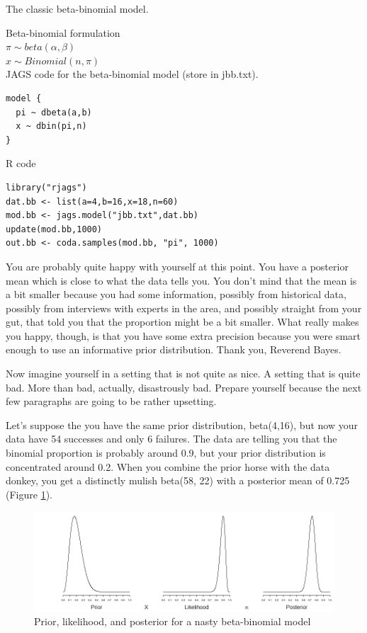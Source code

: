 \documentclass[12pt]{article}
\begin{document}
\begin{table}
\caption{The classic beta-binomial model. \label{tab:bb_code}}

Beta-binomial formulation \\

$\pi \sim beta(\alpha, \beta)$ \\
$x \sim Binomial(n, \pi)$ \\

JAGS code for the beta-binomial model (store in jbb.txt). 

\begin{verbatim}
model {
  pi ~ dbeta(a,b)
  x ~ dbin(pi,n)
}
\end{verbatim}

R code

\begin{verbatim}
library("rjags")
dat.bb <- list(a=4,b=16,x=18,n=60)
mod.bb <- jags.model("jbb.txt",dat.bb)
update(mod.bb,1000)
out.bb <- coda.samples(mod.bb, "pi", 1000)
\end{verbatim}
\end{table}

\linespread{1.6}

You are probably quite happy with yourself at this point. You have a posterior mean which is close to what the data tells you. You don't mind that the mean is a bit smaller because you had some information, possibly from historical data, possibly from interviews with experts in the area, and possibly straight from your gut, that told you that the proportion might be a bit smaller. What really makes you happy, though, is that you have some extra precision because you were smart enough to use an informative prior distribution. Thank you, Reverend Bayes.

Now imagine yourself in a setting that is not quite as nice. A setting that is quite bad. More than bad, actually, disastrously bad. Prepare yourself because the next few paragraphs are going to be rather upsetting.  

Let's suppose the you have the same prior distribution, beta(4,16), but now your data have 54 successes and only 6 failures. The data are telling you that the binomial proportion is probably around 0.9, but your prior distribution is concentrated around 0.2. When you combine the prior horse with the data donkey, you get a distinctly mulish beta(58, 22) with a posterior mean of 0.725 (Figure \ref{fig:bb_nasty}).

\begin{figure}
\begin{center}
\includegraphics[width=6in]{fig2.png}
\end{center}
\caption{Prior, likelihood, and posterior for a nasty beta-binomial model \label{fig:bb_nasty}}
\end{figure}
\end{document}
